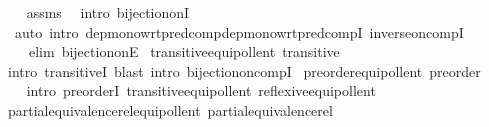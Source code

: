 \begin{isabellebody}
%
\isadelimproof
\ \ %
\endisadelimproof
%
\isatagproof
{}\isamarkupfalse%
\ assms\ \isamarkupfalse%
\ {\isacharparenleft}{\kern0pt}intro\ bijection{\isacharunderscore}{\kern0pt}onI{\isacharparenright}{\kern0pt}\isanewline
\ \ {\isacharparenleft}{\kern0pt}auto\ intro{\isacharcolon}{\kern0pt}\ dep{\isacharunderscore}{\kern0pt}mono{\isacharunderscore}{\kern0pt}wrt{\isacharunderscore}{\kern0pt}pred{\isacharunderscore}{\kern0pt}comp{\isacharunderscore}{\kern0pt}dep{\isacharunderscore}{\kern0pt}mono{\isacharunderscore}{\kern0pt}wrt{\isacharunderscore}{\kern0pt}pred{\isacharunderscore}{\kern0pt}compI{\isacharprime}{\kern0pt}\ inverse{\isacharunderscore}{\kern0pt}on{\isacharunderscore}{\kern0pt}compI\isanewline
\ \ \ \ elim{\isacharbang}{\kern0pt}{\isacharcolon}{\kern0pt}\ bijection{\isacharunderscore}{\kern0pt}onE{\isacharparenright}{\kern0pt}%
\endisatagproof
{\isafoldproof}%
%
\isadelimproof
\isanewline
%
\endisadelimproof
\isanewline
{}\isamarkupfalse%
\ transitive{\isacharunderscore}{\kern0pt}equipollent{\isacharcolon}{\kern0pt}\ {\isachardoublequoteopen}transitive\ {\isacharparenleft}{\kern0pt}{\isasymapprox}{\isacharparenright}{\kern0pt}{\isachardoublequoteclose}\isanewline
%
\isadelimproof
\ \ %
\endisadelimproof
%
\isatagproof
{}\isamarkupfalse%
\ {\isacharparenleft}{\kern0pt}intro\ transitiveI{\isacharparenright}{\kern0pt}\ {\isacharparenleft}{\kern0pt}blast\ intro{\isacharcolon}{\kern0pt}\ bijection{\isacharunderscore}{\kern0pt}on{\isacharunderscore}{\kern0pt}compI{\isacharparenright}{\kern0pt}%
\endisatagproof
{\isafoldproof}%
%
\isadelimproof
\isanewline
%
\endisadelimproof
\isanewline
{}\isamarkupfalse%
\ preorder{\isacharunderscore}{\kern0pt}equipollent{\isacharcolon}{\kern0pt}\ {\isachardoublequoteopen}preorder\ {\isacharparenleft}{\kern0pt}{\isasymapprox}{\isacharparenright}{\kern0pt}{\isachardoublequoteclose}\isanewline
%
\isadelimproof
\ \ %
\endisadelimproof
%
\isatagproof
{}\isamarkupfalse%
\ {\isacharparenleft}{\kern0pt}intro\ preorderI\ transitive{\isacharunderscore}{\kern0pt}equipollent\ reflexive{\isacharunderscore}{\kern0pt}equipollent{\isacharparenright}{\kern0pt}%
\endisatagproof
{\isafoldproof}%
%
\isadelimproof
\isanewline
%
\endisadelimproof
\isanewline
{}\isamarkupfalse%
\ partial{\isacharunderscore}{\kern0pt}equivalence{\isacharunderscore}{\kern0pt}rel{\isacharunderscore}{\kern0pt}equipollent{\isacharcolon}{\kern0pt}\ {\isachardoublequoteopen}partial{\isacharunderscore}{\kern0pt}equivalence{\isacharunderscore}{\kern0pt}rel\ {\isacharparenleft}{\kern0pt}{\isasymapprox}{\isacharparenright}{\kern0pt}{\isachardoublequoteclose}\isanewline

\end{isabellebody}
